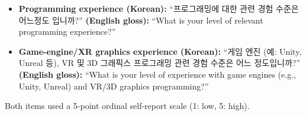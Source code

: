 \begin{itemize}
    \item \textbf{Programming experience (Korean):}
    ``프로그래밍에 대한 관련 경험 수준은 어느정도 입니까?''
    \textbf{(English gloss):} ``What is your level of relevant programming experience?''
    \item \textbf{Game-engine/XR graphics experience (Korean):}
    ``게임 엔진 (예: Unity, Unreal 등), VR 및 3D 그래픽스 프로그래밍 관련 경험 수준은 어느 정도입니까?''
    \textbf{(English gloss):} ``What is your level of experience with game engines
    (e.g., Unity, Unreal) and VR/3D graphics programming?''
\end{itemize}

Both items used a 5-point ordinal self-report scale (1: low, 5: high).
